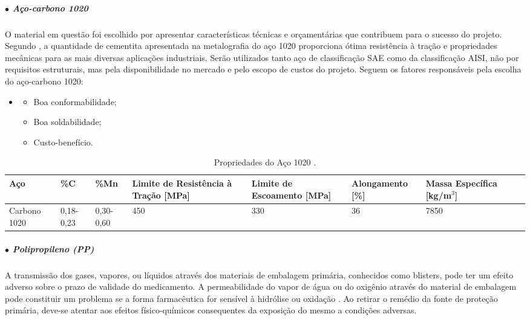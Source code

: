 \subparagraph*{$\bullet$ Aço-carbono 1020}\hfill

O material em questão foi escolhido por apresentar características técnicas e orçamentárias que contribuem para o sucesso do projeto. Segundo \cite{Aco_1020_ensaio}, a quantidade de cementita apresentada na metalografia do aço 1020 proporciona ótima resistência à traç{\~a}o e propriedades mecânicas para as mais diversas aplicações industriais. Serão utilizados tanto aço de classificação SAE como da classificação AISI, não por requisitos estruturais, mas pela disponibilidade no mercado e pelo escopo de custos do projeto. Seguem os fatores responsáveis pela escolha do aço-carbono 1020:

\begin{itemize}
    \item []
    \begin{itemize}
        \item Boa conformabilidade;
        \item Boa soldabilidade;
        \item Custo-benefício.
    \end{itemize}
\end{itemize}

\begin{table}[H]
    \centering
    \caption{Propriedades do Aço 1020 \cite{Askeland_Wright_2019}.}
    \label{tab:PropA1020}
    \begin{adjustbox}{max width = \textwidth}
        \begin{tabular}{|C{2cm}|C{2cm}|C{2cm}|C{3cm}|C{3cm}|C{3cm}|C{2.8cm}|C{2cm}|C{3cm}|}
            \hline
            \textbf{Aço } & \textbf{\%C} & \textbf{\%Mn} & \textbf{Limite de Resistência à Tração [MPa]} & \textbf{Limite de Escoamento [MPa]} & \textbf{Alongamento [\%]} &
            \textbf{Massa Específica [kg/m$^3$]} \\ \hline
              Carbono 1020 & 0,18-0,23 & 0,30-0,60 & 450  & 330 & 36 & 7850
             \\ \hline
            
        \end{tabular}
    \end{adjustbox}
\end{table}



\subparagraph*{$\bullet$ Polipropileno (PP)}\hfill 

 A transmissão dos gases, vapores, ou líquidos através dos materiais de embalagem primária, conhecidos como blisters, pode ter um efeito adverso sobre o prazo de validade do medicamento. A permeabilidade do vapor de água ou do oxigênio através do material de embalagem pode constituir um problema se a forma farmacêutica for sensível à hidrólise ou oxidação \cite{embalagem}. Ao retirar o remédio da fonte de proteção primária, deve-se atentar aos efeitos físico-químicos consequentes da exposição do mesmo a condições adversas. 

